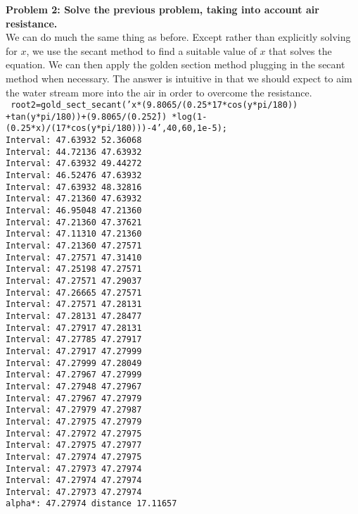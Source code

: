 \documentclass[11pt]{article}
\numberwithin{equation}{section}  %
\begin{document}
\noindent\textbf{Problem 2: Solve the previous problem, taking into account air resistance.}
\\
\noindent We can do much the same thing as before. Except rather than explicitly solving for $x$, we use the secant method to find a suitable value of $x$ that solves the equation. We can then apply the golden section method plugging in the secant method when necessary. The answer is intuitive in that we should expect to aim the water stream more into the air in order to overcome the resistance.\\
\texttt{
root2=gold\_sect\_secant('x*(9.8065/(0.25*17*cos(y*pi/180))
+tan(y*pi/180))+(9.8065/(0.25\^2))
*log(1-(0.25*x)/(17*cos(y*pi/180)))-4',40,60,1e-5);\\
Interval: 47.63932 52.36068\\
Interval: 44.72136 47.63932\\
Interval: 47.63932 49.44272\\
Interval: 46.52476 47.63932\\
Interval: 47.63932 48.32816\\
Interval: 47.21360 47.63932\\
Interval: 46.95048 47.21360\\
Interval: 47.21360 47.37621\\
Interval: 47.11310 47.21360\\
Interval: 47.21360 47.27571\\
Interval: 47.27571 47.31410\\
Interval: 47.25198 47.27571\\
Interval: 47.27571 47.29037\\
Interval: 47.26665 47.27571\\
Interval: 47.27571 47.28131\\
Interval: 47.28131 47.28477\\
Interval: 47.27917 47.28131\\
Interval: 47.27785 47.27917\\
Interval: 47.27917 47.27999\\
Interval: 47.27999 47.28049\\
Interval: 47.27967 47.27999\\
Interval: 47.27948 47.27967\\
Interval: 47.27967 47.27979\\
Interval: 47.27979 47.27987\\
Interval: 47.27975 47.27979\\
Interval: 47.27972 47.27975\\
Interval: 47.27975 47.27977\\
Interval: 47.27974 47.27975\\
Interval: 47.27973 47.27974\\
Interval: 47.27974 47.27974\\
Interval: 47.27973 47.27974\\
alpha*: 47.27974 distance 17.11657}
\end{document}
